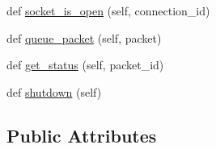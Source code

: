 \begin{DoxyCompactItemize}
\item 
def \hyperlink{classparlai_1_1mturk_1_1core_1_1socket__manager_1_1SocketManager_a895934ce725c0770e94ff6ba0842078e}{socket\+\_\+is\+\_\+open} (self, connection\+\_\+id)
\item 
def \hyperlink{classparlai_1_1mturk_1_1core_1_1socket__manager_1_1SocketManager_a91c7216d011823f1c6c4963d863638c8}{queue\+\_\+packet} (self, packet)
\item 
def \hyperlink{classparlai_1_1mturk_1_1core_1_1socket__manager_1_1SocketManager_ad14d75f5b3a3e41a9133de9cd1611b8b}{get\+\_\+status} (self, packet\+\_\+id)
\item 
def \hyperlink{classparlai_1_1mturk_1_1core_1_1socket__manager_1_1SocketManager_ac98d9330dbc0bcfad53a7a66c09fb56a}{shutdown} (self)
\end{DoxyCompactItemize}
\subsection*{Public Attributes}
